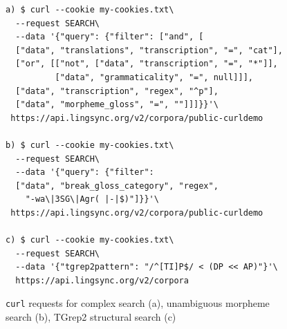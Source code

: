 \documentclass[11pt]{article}
\begin{document}
%
\begin{figure}[h]
\scriptsize
\begin{verbatim}
a) $ curl --cookie my-cookies.txt\
  --request SEARCH\
  --data '{"query": {"filter": ["and", [
  ["data", "translations", "transcription", "=", "cat"],
  ["or", [["not", ["data", "transcription", "=", "*"]],
          ["data", "grammaticality", "=", null]]],
  ["data", "transcription", "regex", "^p"],
  ["data", "morpheme_gloss", "=", ""]]]}}'\
 https://api.lingsync.org/v2/corpora/public-curldemo
 
b) $ curl --cookie my-cookies.txt\
  --request SEARCH\
  --data '{"query": {"filter":
  ["data", "break_gloss_category", "regex",
    "-wa\|3SG\|Agr( |-|$)"]}}'\
 https://api.lingsync.org/v2/corpora/public-curldemo

c) $ curl --cookie my-cookies.txt\
  --request SEARCH\
  --data '{"tgrep2pattern": "/^[TI]P$/ < (DP << AP)"}'\
  https://api.lingsync.org/v2/corpora
\end{verbatim}
\caption{\texttt{curl} requests for complex search (a), unambiguous morpheme search (b), TGrep2 structural search (c)}
\normalsize
\label{fig:api-search}
\end{figure}
%
%

%
%
\end{document}
